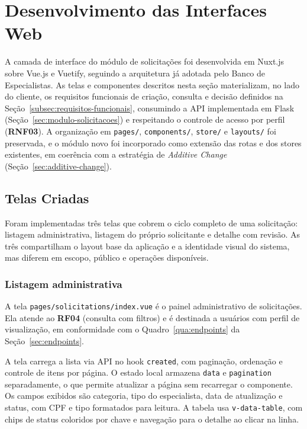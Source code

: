 \section{Desenvolvimento das Interfaces Web}
\label{sec:interfaces-web}

A camada de interface do módulo de solicitações foi desenvolvida em Nuxt.js sobre Vue.js e
Vuetify, seguindo a arquitetura já adotada pelo Banco de Especialistas. As telas e componentes
descritos nesta seção materializam, no lado do cliente, os requisitos funcionais de criação,
consulta e decisão definidos na Seção~\ref{subsec:requisitos-funcionais}, consumindo a API implementada em Flask (Seção~\ref{sec:modulo-solicitacoes})
e respeitando o controle de acesso por perfil (\textbf{RNF03}). A organização em \texttt{pages/},
\texttt{components/}, \texttt{store/} e \texttt{layouts/} foi preservada, e o módulo novo foi
incorporado como extensão das rotas e dos stores existentes, em coerência com a estratégia de
\textit{Additive Change} (Seção~\ref{sec:additive-change}).

\subsection{Telas Criadas}

Foram implementadas três telas que cobrem o ciclo completo de uma solicitação: listagem
administrativa, listagem do próprio solicitante e detalhe com revisão. As três
compartilham o layout base da aplicação e a identidade visual do sistema, mas diferem em
escopo, público e operações disponíveis.

\subsubsection{Listagem administrativa}

A tela \texttt{pages/solicitations/index.vue} é o painel administrativo de solicitações.
Ela atende ao \textbf{RF04} (consulta com filtros) e é destinada a usuários com perfil de
visualização, em conformidade com o Quadro~\ref{qua:endpoints} da Seção~\ref{sec:endpoints}.

A tela carrega a lista via API no hook \texttt{created}, com paginação, ordenação e
controle de itens por página. O estado local armazena \texttt{data} e
\texttt{pagination} separadamente, o que permite atualizar a página sem recarregar o
componente. Os campos exibidos são categoria, tipo do especialista, data de atualização
e status, com CPF e tipo formatados para leitura. A tabela usa \texttt{v-data-table},
com chips de status coloridos por chave e navegação para o detalhe ao clicar na linha.

